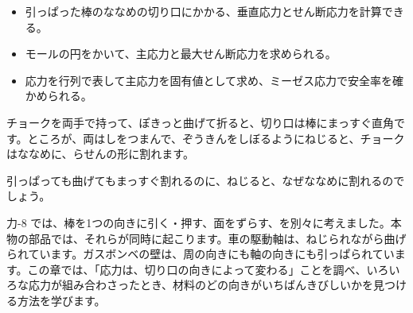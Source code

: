 
\begin{goal}
\begin{itemize}[label={\color{bkTheme}●}, leftmargin=1.6\zw, itemsep=0pt, topsep=1pt]
\item {}\enspace 引っぱった棒のななめの切り口にかかる、垂直応力とせん断応力を計算できる。
\item {}\enspace モールの円をかいて、主応力と最大せん断応力を求められる。
\item {}\enspace 応力を行列で表して主応力を固有値として求め、ミーゼス応力で安全率を確かめられる。
\end{itemize}
\end{goal}

\begin{hatena}
\noindent\begin{minipage}[c]{0.58\linewidth}\raggedright
チョークを両手で持って、ぽきっと曲げて折ると、切り口は棒にまっすぐ直角です。ところが、両はしをつまんで、ぞうきんをしぼるようにねじると、チョークはななめに、らせんの形に割れます。

引っぱっても曲げてもまっすぐ割れるのに、ねじると、なぜななめに割れるのでしょう。
\end{minipage}\hfill
\begin{minipage}[c]{0.38\linewidth}\centering
{}
\end{minipage}
\end{hatena}

\noindent 力-8 では、棒を1つの向きに引く・押す、面をずらす、を別々に考えました。本物の部品では、それらが同時に起こります。車の駆動軸は、ねじられながら曲げられています。ガスボンベの壁は、周の向きにも軸の向きにも引っぱられています。この章では、「応力は、切り口の向きによって変わる」ことを調べ、いろいろな応力が組み合わさったとき、材料のどの向きがいちばんきびしいかを見つける方法を学びます。

